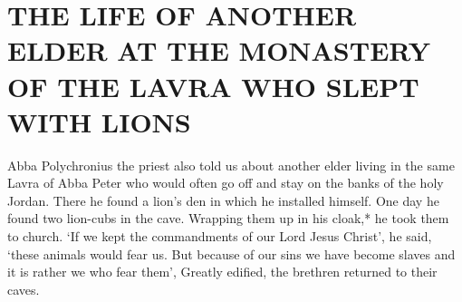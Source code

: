 \chapter{THE LIFE OF ANOTHER ELDER AT THE MONASTERY OF THE LAVRA WHO SLEPT WITH LIONS}

Abba Polychronius the priest also told us about another elder living in the same Lavra of Abba Peter who would often go off and stay
on the banks of the holy Jordan.
There he found a lion's den in which he installed himself.
One day he found two lion-cubs in the cave.
Wrapping them up in his cloak,* he took them to church.
`If we kept the commandments of our Lord Jesus Christ', he said,
`these animals would fear us.
But because of our sins we have become slaves and it is rather we who fear them', Greatly edified, the brethren returned to their caves.
